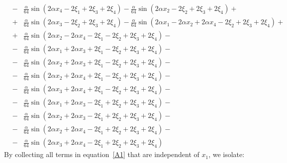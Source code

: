 \documentclass[11pt]{jfm}
\numberwithin{equation}{section}
\begin{document}
\begin{eqnarray}
&\!-\!& \frac{\alpha}{64} \sin(2\alpha x_4 \!-\! 2\xi_1 \!+\! 2\xi_3 \!+\! 2\xi_4)\!-\! \frac{\alpha}{64} \sin(2\alpha x_2 \!-\! 2\xi_2 \!+\! 2\xi_3 \!+\! 2\xi_4)\!+\! \nonumber\\
&\!+\!& \frac{\alpha}{64} \sin(2\alpha x_3 \!-\! 2\xi_2 \!+\! 2\xi_3 \!+\! 2\xi_4)\!-\! \frac{\alpha}{64} \sin(2\alpha x_1 \!-\! 2\alpha x_2 \!+\! 2\alpha x_4 \!-\! 2\xi_2 \!+\! 2\xi_3 \!+\! 2\xi_4)\!+\!\nonumber\\ &\!+\!&\frac{\alpha}{64} \sin(2\alpha x_2 \!-\! 2\alpha x_4 \!-\! 2\xi_1 \!-\! 2\xi_2 \!+\! 2\xi_3 \!+\! 2\xi_4)\!-\! \nonumber\\
&\!-\!& \frac{\alpha}{64} \sin(2\alpha x_1 \!+\! 2\alpha x_3 \!+\! 2\xi_1 \!-\! 2\xi_2 \!+\! 2\xi_3 \!+\! 2\xi_4)\!-\! \nonumber\\
&\!-\! &\frac{\alpha}{64} \sin(2\alpha x_2 \!+\! 2\alpha x_3 \!+\! 2\xi_1 \!-\! 2\xi_2 \!+\! 2\xi_3 \!+\! 2\xi_4)\!-\! \nonumber\\
&\!-\!& \frac{\alpha}{64} \sin(2\alpha x_2 \!+\! 2\alpha x_4 \!+\! 2\xi_1 \!-\! 2\xi_2 \!+\! 2\xi_3 \!+\! 2\xi_4)\!-\! \nonumber\\
&\!-\!& \frac{\alpha}{64} \sin(2\alpha x_3 \!+\! 2\alpha x_4 \!+\! 2\xi_1 \!-\! 2\xi_2 \!+\! 2\xi_3 \!+\! 2\xi_4)\!-\! \nonumber\\
&\!-\!& \frac{\alpha}{64} \sin(2\alpha x_1 \!+\! 2\alpha x_3 \!-\! 2\xi_1 \!+\! 2\xi_2 \!+\! 2\xi_3 \!+\! 2\xi_4)\!-\! \nonumber\\
&\!-\!& \frac{\alpha}{64} \sin(2\alpha x_2 \!+\! 2\alpha x_3 \!-\! 2\xi_1 \!+\! 2\xi_2 \!+\! 2\xi_3 \!+\! 2\xi_4)\!-\! \nonumber\\
&\!-\!& \frac{\alpha}{64} \sin(2\alpha x_2 \!+\! 2\alpha x_4 \!-\! 2\xi_1 \!+\! 2\xi_2 \!+\! 2\xi_3 \!+\! 2\xi_4)\!-\! \nonumber\\
&\!-\!& \frac{\alpha}{64} \sin(2\alpha x_3 \!+\! 2\alpha x_4 - 2\xi_1 \!+\! 2\xi_2 \!+\! 2\xi_3 \!+\! 2\xi_4)
\end{eqnarray}
By collecting all terms in equation~\eqref{A1} that are independent of \( x_1 \), we isolate:
\end{document}
